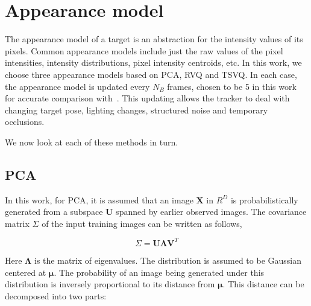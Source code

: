 

\section{Appearance model}
\label{Sec:RVQ_trk_appearance_model}
The appearance model of a target is an abstraction for the intensity values of its pixels.  Common appearance models include just the raw values of the pixel intensities, intensity distributions, pixel intensity centroids, etc.  In this work, we choose three appearance models based on PCA, RVQ and TSVQ.  In each case, the appearance model is updated every $N_B$ frames, chosen to be 5 in this work for accurate comparison with~\cite{2008_JNL_subspaceTRK_Ross}.    This updating allows the tracker to deal with changing target pose, lighting changes, structured noise and temporary occlusions.   





We now look at each of these methods in turn.

\subsection{PCA}
\label{Sec:Chap5_PCA}

In this work, for PCA, it is assumed that an image $\mathbf{X}$ in $R^D$ is probabilistically generated from a subspace $\mathbf{U}$ spanned by earlier observed images.  The covariance matrix $\Sigma$ of the input training images can be written as follows,  

\begin{equation}
\Sigma = \mathbf{U}\mathbf{\Lambda} \mathbf{V}^T
\end{equation}

Here $\mathbf{\Lambda}$ is the matrix of eigenvalues.  The distribution is assumed to be Gaussian centered at $\mathbf{\mu}$.  The probability of an image being generated under this distribution is inversely proportional to its distance from $\mathbf{\mu}$.  This distance can be decomposed into two parts:

